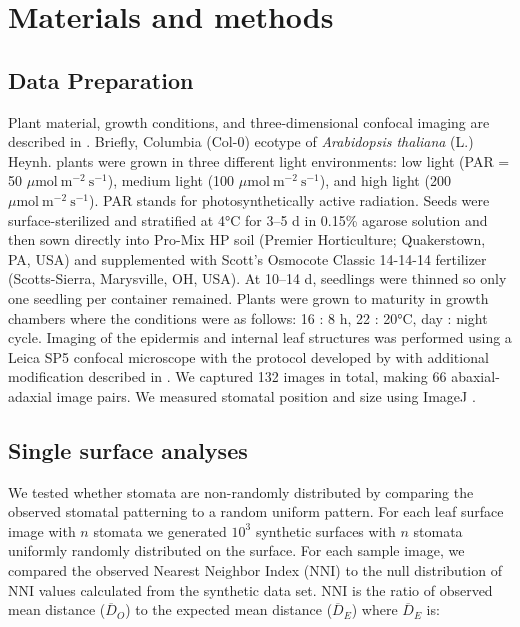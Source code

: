 \documentclass[webpdf,large,modern,unnumsec,namedate]{oup-authoring-template}
\begin{document}
\hypertarget{materials-and-methods}{%
\section{Materials and methods}\label{materials-and-methods}}

\hypertarget{data-preparation}{%
\subsection{Data Preparation}\label{data-preparation}}

Plant material, growth conditions, and three-dimensional confocal
imaging are described in \citet{dow_disruption_2017}. Briefly, Columbia
(Col-0) ecotype of \emph{Arabidopsis thaliana} (L.) Heynh. plants were
grown in three different light environments: low light (PAR = 50
\(\mu \text{mol}~\text{m}^{-2}~\text{s}^{-1}\)), medium light (100
\(\mu \text{mol}~\text{m}^{-2}~\text{s}^{-1}\)), and high light (200
\(\mu \text{mol}~\text{m}^{-2}~\text{s}^{-1}\)). PAR stands for
photosynthetically active radiation. Seeds were surface-sterilized and
stratified at 4°C for 3--5 d in 0.15\% agarose solution and then sown
directly into Pro-Mix HP soil (Premier Horticulture; Quakerstown, PA,
USA) and supplemented with Scott's Osmocote Classic 14-14-14 fertilizer
(Scotts-Sierra, Marysville, OH, USA). At 10--14 d, seedlings were
thinned so only one seedling per container remained. Plants were grown
to maturity in growth chambers where the conditions were as follows: 16
: 8 h, 22 : 20°C, day : night cycle. Imaging of the epidermis and
internal leaf structures was performed using a Leica SP5 confocal
microscope with the protocol developed by
\citet{wuyts_high-contrast_2010} with additional modification described
in \citet{dow_disruption_2017}. We captured 132 images in total, making
66 abaxial-adaxial image pairs. We measured stomatal position and size
using ImageJ \citep{schneider_nih_2012}.

\hypertarget{single-surface-analyses}{%
\subsection{Single surface analyses}\label{single-surface-analyses}}

We tested whether stomata are non-randomly distributed by comparing the
observed stomatal patterning to a random uniform pattern. For each leaf
surface image with \(n\) stomata we generated \(10^3\) synthetic
surfaces with \(n\) stomata uniformly randomly distributed on the
surface. For each sample image, we compared the observed Nearest
Neighbor Index (\(\mathrm{NNI}\)) to the null distribution of
\(\mathrm{NNI}\) values calculated from the synthetic data set.
\(\mathrm{NNI}\) is the ratio of observed mean distance
(\(\overline{D}_O\)) to the expected mean distance (\(\overline{D}_E\))
where \(\overline{D}_E\) is:
\end{document}
